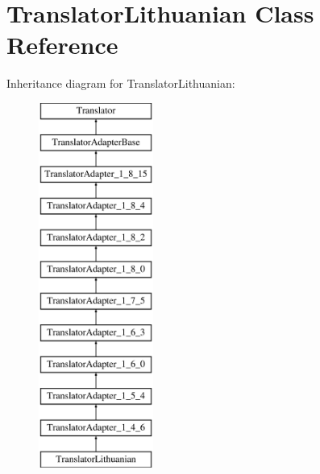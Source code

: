 \hypertarget{class_translator_lithuanian}{}\section{Translator\+Lithuanian Class Reference}
\label{class_translator_lithuanian}
Inheritance diagram for Translator\+Lithuanian\+:\begin{figure}[H]
\begin{center}
\leavevmode
\includegraphics[height=12.000000cm]{class_translator_lithuanian}
\end{center}
\end{figure}
